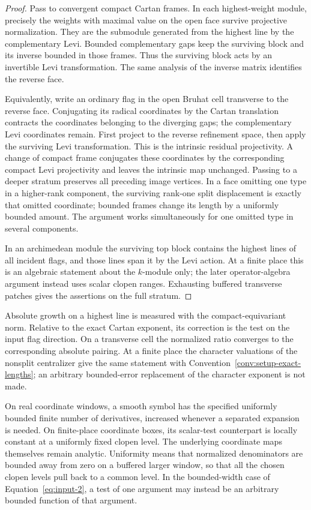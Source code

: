 \begin{proof}
Pass to convergent compact Cartan frames.  In each highest-weight
module, precisely the weights with maximal value on the open face
survive projective normalization.  They are the submodule generated
from the highest line by the complementary Levi.  Bounded
complementary gaps keep the surviving block and its inverse bounded
in those frames.  Thus the surviving block acts by an invertible Levi
transformation.  The same analysis of the inverse matrix identifies
the reverse face.

Equivalently, write an ordinary flag in the open Bruhat cell
transverse to the reverse face.  Conjugating its radical coordinates
by the Cartan translation contracts the coordinates belonging to the
diverging gaps; the complementary Levi coordinates remain.  First
project to the reverse refinement space, then apply the surviving
Levi transformation.  This is the intrinsic residual projectivity.
A change of compact frame conjugates these coordinates by the
corresponding compact Levi projectivity and leaves the intrinsic map
unchanged.  Passing to a deeper stratum preserves all preceding image
vertices.  In a face omitting one type in a higher-rank component,
the surviving rank-one split displacement is exactly that omitted
coordinate; bounded frames change its length by a uniformly bounded
amount.  The argument works simultaneously for one omitted type in
several components.

In an archimedean module the surviving top block contains the highest
lines of all incident flags, and those lines span it by the Levi
action.  At a finite place this is an algebraic statement about the
$k$-module only; the later operator-algebra argument instead uses
scalar clopen ranges.  Exhausting buffered transverse patches gives
the assertions on the full stratum.
\end{proof}

Absolute growth on a highest line is measured with the compact-equivariant
norm.  Relative to the exact Cartan exponent, its correction is the
test on the input flag direction.  On a transverse cell the normalized
ratio converges to the corresponding absolute pairing.  At a finite
place the character valuations of the nonsplit centralizer give the
same statement with Convention~\ref{conv:setup-exact-lengths}; an
arbitrary bounded-error replacement of the character exponent is not
made.

\begin{convention}
\label{conv:setup-symbols}
On real coordinate windows, a smooth symbol has the specified
uniformly bounded finite number of derivatives, increased whenever
a separated expansion is needed.  On finite-place coordinate boxes,
its scalar-test counterpart is locally constant at a uniformly fixed
clopen level.  The underlying coordinate maps themselves remain
analytic.  Uniformity means that normalized denominators are bounded
away from zero on a buffered larger window, so that all the chosen
clopen levels pull back to a common level.  In the bounded-width
case of Equation~\eqref{eq:input-2}, a test of one argument may
instead be an arbitrary bounded function of that argument.
\end{convention}

